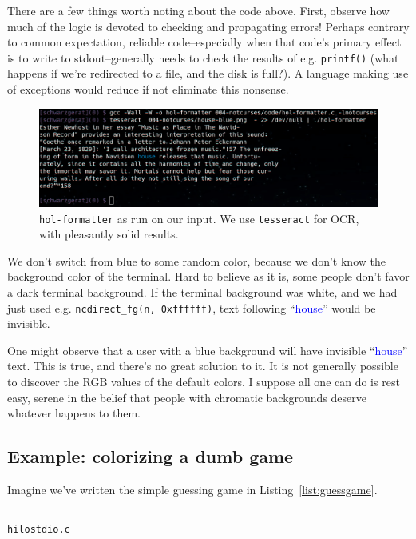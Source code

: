 \documentclass[letterpaper,10pt]{article}
\begin{document}
There are a few things worth noting about the code above. First, observe how
much of the logic is devoted to checking and propagating errors! Perhaps
contrary to common expectation, reliable code--especially when that code's
primary effect is to write to stdout--generally needs to check the results of
e.g. \texttt{printf()} (what happens if we're redirected to a file, and
the disk is full?). A language making use of exceptions would reduce if not
eliminate this nonsense.

\begin{figure}[!htbp]
\centering \includegraphics[width=.75\linewidth]{hol-formatted.png}
\caption[\texttt{hol-formatter} as run on OCRd input.]{\texttt{hol-formatter} as run on our input. We use \texttt{tesseract} for OCR, with pleasantly solid results.}
\label{fig:houseout}
\end{figure}

We don't switch from blue to some random color, because we don't know the
background color of the terminal. Hard to believe as it is, some people don't
favor a dark terminal background. If the terminal background was white, and we
had just used e.g. \texttt{ncdirect\_fg(n, 0xffffff)}, text following
``\textcolor{blue}{house}'' would be invisible.

One might observe that a user with a blue background will have invisible
``\textcolor{blue}{house}'' text. This is true, and there's no great solution
to it. It is not generally possible to discover the RGB values of the default
colors. I suppose all one can do is rest easy, serene in the belief that people
with chromatic backgrounds deserve whatever happens to them.

\subsection{Example: colorizing a dumb game}

Imagine we've written the simple guessing game in Listing~\ref{list:guessgame}.

\begin{listing}[!htbp]
\inputminted[]{C}{code/hilostdio.c}
\caption{\texttt{hilostdio.c}}
\label{list:guessgame}
\end{listing}
\end{document}
